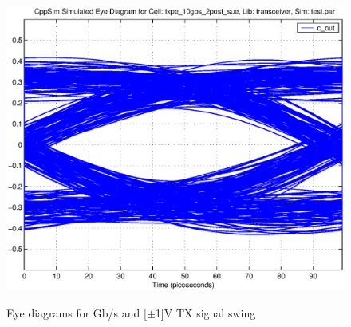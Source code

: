 \begin{figure}[H]
  {\includegraphics[scale=0.5]{eyes/eye_10gbs_2post.eps}}
  \caption{Eye diagrams for \unit[10]{Gb/s} and \unit[$\pm$1]{V} TX signal swing}
  \label{fig:eyes_10gbs}
\end{figure}

